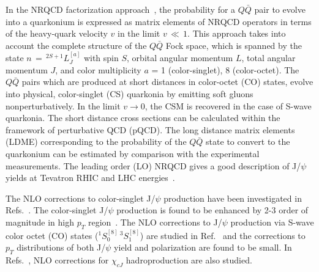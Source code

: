 \documentclass[12pt,a4paper,final]{iopart}
\newcommand{\barQ}{{\bar{Q}}}
\begin{document}
  In the NRQCD factorization approach~\cite{Bodwin:1994jh},
the probability for a $Q\bar Q$ pair to evolve into a quarkonium is expressed
as matrix elements of NRQCD operators in terms of the heavy-quark velocity 
$v$ in the limit $v\,\ll\,1$. This approach takes into account the complete structure of 
the $Q\bar Q$ Fock space, which is spanned by the state $n\,=\,^{2S+1}L_{J}^{[a]}$ 
with spin $S$, orbital angular momentum $L$, total angular momentum $J$, 
and color multiplicity $a$ = 1 (color-singlet), 8 (color-octet). 
 The $Q\bar Q$ pairs which are produced at short distances in color-octet (CO) states, 
evolve into physical, color-singlet (CS) quarkonia by emitting soft gluons 
nonperturbatively.
 In the limit $v\rightarrow0$, the CSM is recovered in the case of S-wave quarkonia.
 The short distance cross sections can be calculated within the 
framework of perturbative QCD (pQCD). The long distance matrix elements (LDME) 
corresponding to the probability of the $Q\barQ$ state to convert to the quarkonium 
can be estimated by comparison with the experimental measurements. 
  The leading order (LO) NRQCD gives a good description of J/$\psi$ yields at 
Tevatron RHIC and LHC energies~\cite{Beneke:1996yw,Braaten:1999qk,Sharma:2012dy}.

  The NLO corrections to color-singlet J/$\psi$ production have been investigated 
in Refs.~\cite{Campbell:2007ws,Gong:2008sn}. The color-singlet J/$\psi$ 
production is found to be enhanced by 2-3 order of magnitude in high 
$p_T$ region~\cite{Gong:2008sn}.
 The NLO corrections to J/$\psi$ production via S-wave 
color octet (CO) states ($^1S_{0}^{[8]}\,^3S_{1}^{[8]}$) are studied in 
Ref.~\cite{Gong:2008ft} and the corrections to $p_{T}$ distributions of both 
J/$\psi$ yield and polarization are found to be small. In Refs.~\cite{Ma:2010vd}, 
NLO corrections for $\chi_{cJ}$ hadroproduction are also studied. 
\end{document}
